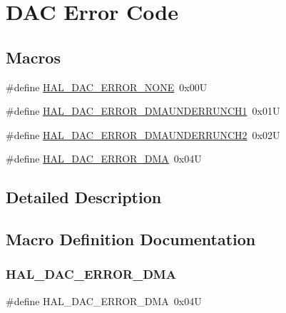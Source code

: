\hypertarget{group___d_a_c___error___code}{}\section{D\+AC Error Code}
\label{group___d_a_c___error___code}
\subsection*{Macros}
\begin{DoxyCompactItemize}
\item 
\#define \mbox{\hyperlink{group___d_a_c___error___code_gac64c9d7d51b93cd3456964debff00329}{H\+A\+L\+\_\+\+D\+A\+C\+\_\+\+E\+R\+R\+O\+R\+\_\+\+N\+O\+NE}}~0x00U
\item 
\#define \mbox{\hyperlink{group___d_a_c___error___code_ga31c84fe07f3d9cf8b534de0167b1e12f}{H\+A\+L\+\_\+\+D\+A\+C\+\_\+\+E\+R\+R\+O\+R\+\_\+\+D\+M\+A\+U\+N\+D\+E\+R\+R\+U\+N\+C\+H1}}~0x01U
\item 
\#define \mbox{\hyperlink{group___d_a_c___error___code_gafa2903c051690408be428f80eb9dccde}{H\+A\+L\+\_\+\+D\+A\+C\+\_\+\+E\+R\+R\+O\+R\+\_\+\+D\+M\+A\+U\+N\+D\+E\+R\+R\+U\+N\+C\+H2}}~0x02U
\item 
\#define \mbox{\hyperlink{group___d_a_c___error___code_ga6c79ec71467a1438b97e3c0bc2017b10}{H\+A\+L\+\_\+\+D\+A\+C\+\_\+\+E\+R\+R\+O\+R\+\_\+\+D\+MA}}~0x04U
\end{DoxyCompactItemize}


\subsection{Detailed Description}


\subsection{Macro Definition Documentation}
\mbox{\label{group___d_a_c___error___code_ga6c79ec71467a1438b97e3c0bc2017b10}} 
\subsubsection{\texorpdfstring{HAL\_DAC\_ERROR\_DMA}{HAL\_DAC\_ERROR\_DMA}}
{\footnotesize\ttfamily \#define H\+A\+L\+\_\+\+D\+A\+C\+\_\+\+E\+R\+R\+O\+R\+\_\+\+D\+MA~0x04U}

